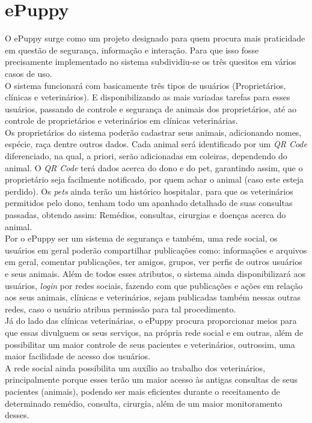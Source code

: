 \section{ePuppy}
O ePuppy surge como um projeto designado para quem procura mais praticidade em questão de segurança, informação e interação. Para que isso fosse precisamente implementado no sistema subdividiu-se os três quesitos em vários casos de uso.
\\
\indent
O sistema funcionará com basicamente três tipos de usuários (Proprietários, clínicas e veterinários). E disponibilizando as mais variadas tarefas para esses usuários, passando de controle e segurança de animais dos proprietários, até ao controle de proprietários e veterinários em clínicas veterinárias.
\\
\indent
Os proprietários do sistema poderão cadastrar seus animais, adicionando nomes, espécie, raça dentre outros dados. Cada animal será identificado por um {\it QR Code} diferenciado, na qual, a priori, serão adicionadas em coleiras, dependendo do animal. O {\it QR Code} terá dados acerca do dono e do pet, garantindo assim, que o proprietário seja facilmente notificado, por quem achar o animal (caso este esteja perdido). Os {\it pets} ainda terão um histórico hospitalar, para que os veterinários permitidos pelo dono, tenham todo um apanhado detalhado de suas consultas passadas, obtendo assim: Remédios, consultas, cirurgias e doenças acerca do animal.
\\
\indent
Por o ePuppy ser um sistema de segurança e também, uma rede social, os usuários em geral poderão compartilhar publicações como: informações e arquivos em geral, comentar publicações, ter amigos, grupos, ver perfis de outros usuários e seus animais. Além de todos esses atributos, o sistema ainda disponibilizará aos usuários, {\it login} por redes sociais, fazendo com que publicações e ações em relação aos seus animais, clínicas e veterinários, sejam publicadas também nessas outras redes, caso o usuário atribua permissão para tal procedimento.
\\
\indent
Já do lado das clínicas veterinárias, o ePuppy procura proporcionar meios para que essas divulguem os seus serviços, na própria rede social e em outras, além de possibilitar um maior controle de seus pacientes e veterinários, outrossim, uma maior facilidade de acesso dos usuários.
\\
\indent
A rede social ainda possibilita um auxílio ao trabalho dos veterinários, principalmente porque esses terão um maior acesso às antigas consultas de seus pacientes (animais), podendo ser mais eficientes durante o receitamento de determinado remédio, consulta, cirurgia, além de um maior monitoramento desses.

